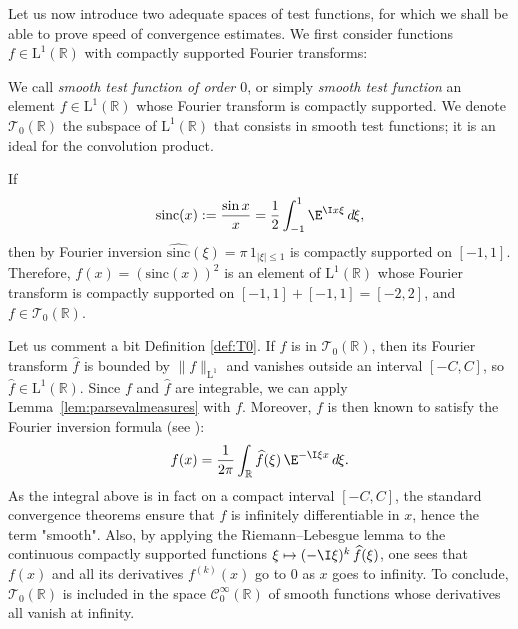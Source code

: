\documentclass[envcountsame]{svmult}
\newcommand{\R}{\mathbb{R}}
\newcommand{\leb}{\mathrm{L}}
\newcommand{\testf}{\mathscr{T}}
\newcommand{\sinc}{\mathrm{sinc}}
\newcommand{\DD}[1]{\,d\hspace*{-0.3mm}{#1}}
\begin{document}
Let us now introduce two adequate spaces of test functions, for which we shall be able to prove speed of convergence estimates. We first consider functions $f \in \leb^1(\R)$ with compactly supported Fourier transforms:
\begin{definition}\label{def:T0}
We call \emph{smooth test function of order $0$}, or simply \emph{smooth test function} an element $f \in \leb^1(\R)$ whose Fourier transform is compactly supported.
We denote $\testf_0(\R)$ the subspace of $\leb^1(\R)$ that consists in smooth test functions; it is an ideal for the convolution product.
\end{definition}

\begin{example}
If $$\sinc(x):=\frac{\sin x}{x}=\frac{1}{2}\int_{-1}^1 \E^{\I x\xi}\DD{\xi},$$
then by Fourier inversion $\widehat{\sinc}(\xi) = \pi\,1_{|\xi| \leq 1}$ is compactly supported on $[-1,1]$. Therefore, $f(x) = (\sinc(x))^2$ is an element of $\leb^1(\R)$ whose Fourier transform is compactly supported on $[-1,1]+[-1,1]=[-2,2]$, and $f \in \testf_0(\R)$.
\end{example}

Let us comment a bit Definition \ref{def:T0}. If $f$ is in $\testf_0(\R)$, then its Fourier transform
$\widehat{f}$ is bounded by $\|f\|_{\leb^1}$ and vanishes outside an interval $[-C,C]$, so $\widehat{f} \in \leb^1(\R)$. Since $f$ and $\widehat{f}$ are integrable, we can apply Lemma~\ref{lem:parsevalmeasures} with $f$.
Moreover, $f$ is then known to satisfy the Fourier inversion formula (see \cite[\S7.7]{Rud91}):
$$f(x) = \frac{1}{2\pi}\int_{\R} \widehat{f}(\xi)\,\E^{-\I \xi x}\DD{\xi}.$$
As the integral above is in fact on a compact interval $[-C,C]$, the standard convergence theorems ensure that $f$ is infinitely differentiable in $x$, hence the term "smooth". Also, by applying the Riemann--Lebesgue lemma to the continuous compactly supported functions $\xi \mapsto (-\I \xi)^k\,\widehat{f}(\xi)$, one sees that $f(x)$ and all its derivatives $f^{(k)}(x)$ go to $0$ as $x$ goes to infinity.
To conclude, $\testf_0(\R)$ is included in 
the space $\mathscr{C}_0^\infty(\R)$ of smooth functions whose derivatives all vanish at infinity.
\bigskip
\end{document}
